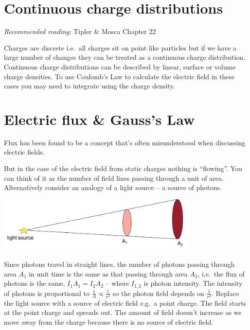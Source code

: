 \documentclass[
]{book}
\begin{document}
\hypertarget{continuous-charge-distributions}{%
\section{Continuous charge distributions}\label{continuous-charge-distributions}}

\emph{Recommended reading:} Tipler \& Mosca Chapter 22

Charges are discrete i.e.~all charges sit on point like particles but if
we have a large number of changes they can be treated as a continuous
charge distribution. Continuous charge distributions can be described by
linear, surface or volume charge densities. To use Coulomb's Law to
calculate the electric field in these cases you may need to integrate
using the charge density.

\hypertarget{electric-flux-gausss-law}{%
\section{Electric flux \& Gauss's Law}\label{electric-flux-gausss-law}}

Flux has been found to be a concept that's often misunderstood when
discussing electric fields.

But in the case of the electric field from static charges nothing is
``flowing''. You can think of it as the number of field lines passing
through a unit of area. Alternatively consider an analogy of a light
source -- a source of photons.

\includegraphics[width=100mm,height=\textheight]{Figures/lightFlux.png} \protect\hypertarget{fig:lightFlux}{}{}

Since photons travel in straight lines, the number of photons passing
through area \(A_1\) in unit time is the same as that passing through area
\(A_2\), i.e.~the flux of photons is the same, \(I_1 A_1 = I_2 A_2\) --
where \(I_{1,2}\) is photon intensity. The intensity of photons is
proportional to \(\frac{1}{A} \propto \frac{1}{r^2}\) so the photon field
depends on \(\frac{1}{r^2}\). Replace the light source with a source of
electric field e.g.~a point charge. The field starts at the point charge
and spreads out. The amount of field doesn't increase as we move away
from the charge because there is no source of electric field.
\end{document}
